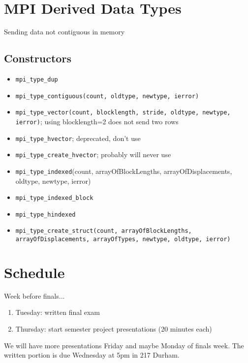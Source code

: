 \documentclass[10pt]{article}
\newenvironment{mitemize}
{
  \begin{itemize}
  \setlength{\itemsep}{1pt}
  \setlength{\parskip}{0pt}
  \setlength{\parsep}{0pt}}{\end{itemize}
}
\newenvironment{menumerate}
{
  \begin{enumerate}
  \setlength{\itemsep}{1pt}
  \setlength{\parskip}{0pt}
  \setlength{\parsep}{0pt}}{\end{enumerate}
}
\begin{document}
\section*{MPI Derived Data Types}
Sending data not contiguous in memory

\subsection*{Constructors}
\begin{mitemize}
  \item \texttt{mpi\_type\_dup}
  \item \texttt{mpi\_type\_contiguous(count, oldtype, newtype, ierror)}
  \item \texttt{mpi\_type\_vector(count, blocklength, stride, oldtype, newtype, ierror)}; using blocklength=2 does not send two rows
  \item \texttt{mpi\_type\_hvector}; deprecated, don't use
  \item \texttt{mpi\_type\_create\_hvector}; probably will never use
  \item \texttt{mpi\_type\_indexed}(count, arrayOfBlockLengths, arrayOfDisplacements, oldtype, newtype, ierror)
  \item \texttt{mpi\_type\_indexed\_block}
  \item \texttt{mpi\_type\_hindexed}
  \item \texttt{mpi\_type\_create\_struct(count, arrayOfBlockLengths, arrayOfDisplacements, arrayOfTypes, newtype, oldtype, ierror)}
\end{mitemize}

\section*{Schedule}
Week before finals...
\begin{menumerate}
  \item Tuesday: written final exam
  \item Thursday: start semester project presentations (20 minutes each)
\end{menumerate}
We will have more presentations Friday and maybe Monday of finals week. The written portion is due Wednesday at 5pm in 217 Durham.
\end{document}
